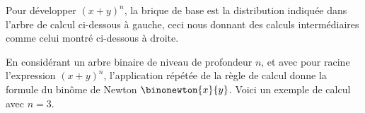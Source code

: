 Pour développer $(x + y)^n$, la brique de base est la distribution indiquée dans l'arbre de calcul ci-dessous à gauche, ceci nous donnant des calculs intermédiaires comme celui montré ci-dessous à droite.

%
            {\intertree}{}

En considérant un arbre binaire de niveau de profondeur $n$, et avec pour racine l'expression $(x + y)^n$, l'application répétée de la règle de calcul donne la formule du binôme de Newton
$\binonewton{x}{y}$.
%
Voici un exemple de calcul avec $n=3$.

